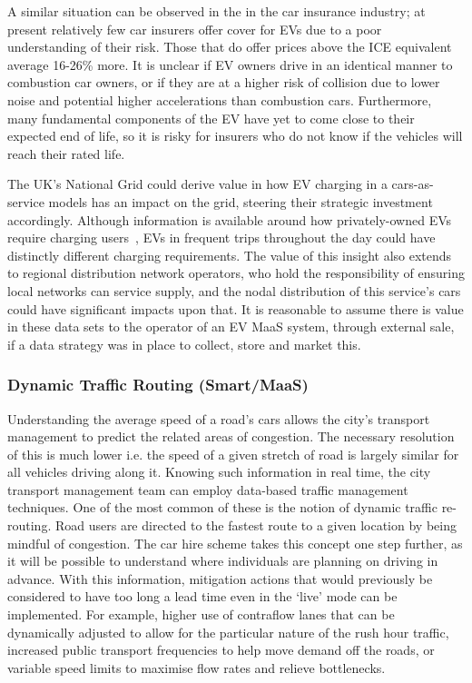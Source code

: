 \documentclass[journal]{IEEEtran}
\begin{document}
A similar situation can be observed in the in the car insurance
industry; at present relatively few car insurers offer cover for EVs
due to a poor understanding of their risk. Those that do offer prices
above the ICE equivalent average 16-26\% more. It is unclear if EV
owners drive in an identical manner to combustion car owners, or if
they are at a higher risk of collision due to lower noise and
potential higher accelerations than combustion cars. Furthermore, many
fundamental components of the EV have yet to come close to their
expected end of life, so it is risky for insurers who do not know if
the vehicles will reach their rated life.

The UK's National Grid could derive value in how EV charging in a
cars-as-service models has an impact on the grid, steering their
strategic investment accordingly.  Although information is available
around how privately-owned EVs require charging
users~\cite{kennel-et-al:2012,darabi+ferdowsi:2013}, EVs in frequent
trips throughout the day could have distinctly different charging
requirements. The value of this insight also extends to regional
distribution network operators, who hold the responsibility of
ensuring local networks can service supply, and the nodal distribution
of this service’s cars could have significant impacts upon that. It is
reasonable to assume there is value in these data sets to the operator
of an EV MaaS system, through external sale, if a data strategy was in
place to collect, store and market this.

\subsubsection{Dynamic Traffic Routing (Smart/MaaS)} 

Understanding the average speed of a road's cars allows the city's
transport management to predict the related areas of congestion. The
necessary resolution of this is much lower i.e. the speed of a given
stretch of road is largely similar for all vehicles driving along
it. Knowing such information in real time, the city transport
management team can employ data-based traffic management
techniques. One of the most common of these is the notion of dynamic
traffic re-routing. Road users are directed to the fastest route to a
given location by being mindful of congestion. The car hire scheme
takes this concept one step further, as it will be possible to
understand where individuals are planning on driving in advance. With
this information, mitigation actions that would previously be
considered to have too long a lead time even in the `live' mode can be
implemented. For example, higher use of contraflow lanes that can be
dynamically adjusted to allow for the particular nature of the rush
hour traffic, increased public transport frequencies to help move
demand off the roads, or variable speed limits to maximise flow rates
and relieve bottlenecks.
\end{document}
